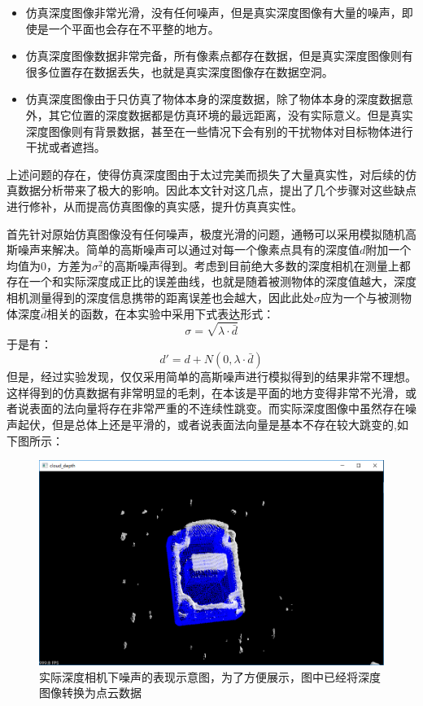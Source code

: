 \begin{itemize}
\item 仿真深度图像非常光滑，没有任何噪声，但是真实深度图像有大量的噪声，即使是一个平面也会存在不平整的地方。
\item 仿真深度图像数据非常完备，所有像素点都存在数据，但是真实深度图像则有很多位置存在数据丢失，也就是真实深度图像存在数据空洞。
\item 仿真深度图像由于只仿真了物体本身的深度数据，除了物体本身的深度数据意外，其它位置的深度数据都是仿真环境的最远距离，没有实际意义。但是真实深度图像则有背景数据，甚至在一些情况下会有别的干扰物体对目标物体进行干扰或者遮挡。
\end{itemize}
上述问题的存在，使得仿真深度图由于太过完美而损失了大量真实性，对后续的仿真数据分析带来了极大的影响。因此本文针对这几点，提出了几个步骤对这些缺点进行修补，从而提高仿真图像的真实感，提升仿真真实性。

首先针对原始仿真图像没有任何噪声，极度光滑的问题，通畅可以采用模拟随机高斯噪声来解决。简单的高斯噪声可以通过对每一个像素点具有的深度值$d$附加一个均值为$0$，方差为$\sigma ^2$的高斯噪声得到。考虑到目前绝大多数的深度相机在测量上都存在一个和实际深度成正比的误差曲线，也就是随着被测物体的深度值越大，深度相机测量得到的深度信息携带的距离误差也会越大，因此此处$\sigma$应为一个与被测物体深度$\bar{d}$相关的函数，在本实验中采用下式表达形式：
\begin{equation}
	\sigma = \sqrt{\lambda \cdot \bar{d}}
\end{equation}
于是有：
\begin{equation}
	d'=d+N(0, \lambda \cdot \bar{d})
\end{equation}
但是，经过实验发现，仅仅采用简单的高斯噪声进行模拟得到的结果非常不理想。这样得到的仿真数据有非常明显的毛刺，在本该是平面的地方变得非常不光滑，或者说表面的法向量将存在非常严重的不连续性跳变。而实际深度图像中虽然存在噪声起伏，但是总体上还是平滑的，或者说表面法向量是基本不存在较大跳变的,如下图所示：

\begin{figure}[htb]
	\centering 
	\includegraphics[width=\textwidth]{./mypic/实际深度相机下噪声的表现示意图.png} 
	\caption{实际深度相机下噪声的表现示意图，为了方便展示，图中已经将深度图像转换为点云数据} 
\end{figure}

